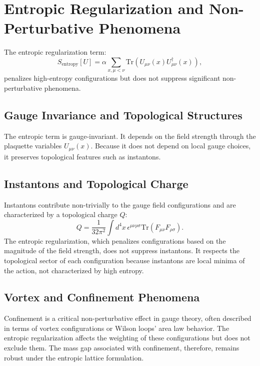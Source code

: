 \section{Entropic Regularization and Non-Perturbative Phenomena}

The entropic regularization term:
\begin{equation}
S_{\text{entropy}}[U] = \alpha \sum_{x, \mu < \nu} \text{Tr} \left(U_{\mu\nu}(x) U_{\mu\nu}^\dagger(x)\right),
\end{equation}
penalizes high-entropy configurations but does not suppress significant non-perturbative phenomena.

\subsection{Gauge Invariance and Topological Structures}

The entropic term is gauge-invariant. It depends on the field strength through the plaquette variables \( U_{\mu\nu}(x) \). Because it does not depend on local gauge choices, it preserves topological features such as instantons.

\subsection{Instantons and Topological Charge}

Instantons contribute non-trivially to the gauge field configurations and are characterized by a topological charge \( Q \):
\begin{equation}
Q = \frac{1}{32\pi^2} \int d^4x \, \epsilon^{\mu\nu\rho\sigma} \text{Tr}(F_{\mu\nu} F_{\rho\sigma}).
\end{equation}
The entropic regularization, which penalizes configurations based on the magnitude of the field strength, does not suppress instantons. It respects the topological sector of each configuration because instantons are local minima of the action, not characterized by high entropy.

\subsection{Vortex and Confinement Phenomena}

Confinement is a critical non-perturbative effect in gauge theory, often described in terms of vortex configurations or Wilson loops' area law behavior. The entropic regularization affects the weighting of these configurations but does not exclude them. The mass gap associated with confinement, therefore, remains robust under the entropic lattice formulation.



